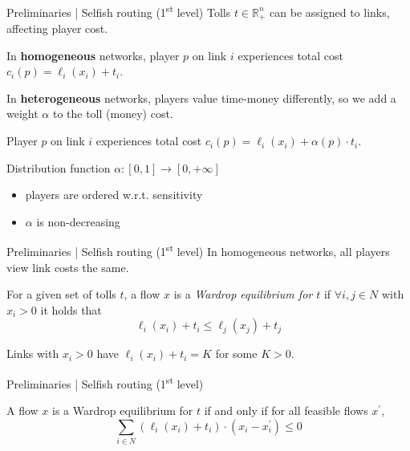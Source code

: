 \documentclass[handout]{beamer}
\newcommand{\R}{\mathbb{R}}
\begin{document}
\begin{frame}{Preliminaries | Selfish routing (1\textsuperscript{st} level)}
	Tolls $t \in \R_+^n$ can be assigned to links, affecting player cost.

	In \textbf{homogeneous} networks, player $p$ on link $i$ experiences total cost $c_i(p) = \ell_i(x_i) + t_i$.

	In \textbf{heterogeneous} networks, players value time-money differently, so we add a weight $\alpha$ to the toll (money) cost.

	Player $p$ on link $i$ experiences total cost $c_i(p) = \ell_i(x_i) + \alpha(p) \cdot t_i$.
	\begin{block}{Distribution function $\alpha: [0, 1] \rightarrow [0, +\infty]$}
		\begin{itemize}
			\item players are ordered w.r.t. sensitivity
			\item $\alpha$ is non-decreasing
		\end{itemize}
	\end{block}
\end{frame}

\begin{frame}{Preliminaries | Selfish routing (1\textsuperscript{st} level)}
	In homogeneous networks, all players view link costs the same.
	\begin{definition}
		For a given set of tolls $t$, a flow $x$ is a \textit{Wardrop equilibrium for $t$} if $\forall i, j \in N$ with $x_i > 0$ it holds that
		\begin{equation*}
			\ell_i(x_i) + t_i \leq \ell_j(x_j) + t_j
		\end{equation*}
	\end{definition}
	Links with $x_i > 0$ have $\ell_i(x_i) + t_i = K$ for some $K > 0$.

\end{frame}

\begin{frame}{Preliminaries | Selfish routing (1\textsuperscript{st} level)}
	\begin{lemma}
		A flow $x$ is a Wardrop equilibrium for $t$ if and only if for all feasible flows $x^\prime$,
		\[\sum_{i \in N} (\ell_i(x_i) + t_i) \cdot (x_i - x_i^\prime) \leq 0\]
	\end{lemma}
\end{frame}
\end{document}
